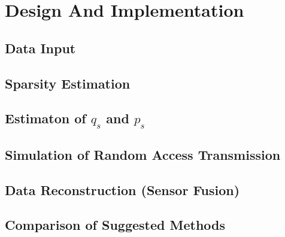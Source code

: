 \documentclass[Main]{subfiles}
\begin{document}
\section{Design And Implementation} %
\label{sec:design_and_implementation}

	\subsection{Data Input} %
	\label{sub:data_input}
	

	\subsection{Sparsity Estimation} %
	\label{sub:sparsity_estimation}
	

	\subsection{Estimaton of $q_s$ and $p_s$} %
	\label{sub:estimaton_of_q_s_and_p_s_}
	

	\subsection{Simulation of Random Access Transmission} %
	\label{sub:simulation_of_random_access_transmission}
	

	\subsection{Data Reconstruction (Sensor Fusion)} %
	\label{sub:data_reconstruction_}
	


	\subsection{Comparison of Suggested Methods} %
	\label{sub:comparison_of_suggested_methods}
	
\end{document}
